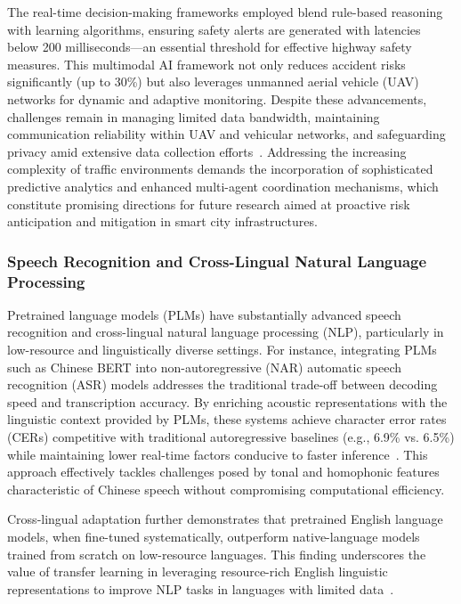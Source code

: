 \documentclass[sigconf]{acmart}
\begin{document}
The real-time decision-making frameworks employed blend rule-based reasoning with learning algorithms, ensuring safety alerts are generated with latencies below 200 milliseconds—an essential threshold for effective highway safety measures. This multimodal AI framework not only reduces accident risks significantly (up to 30\%) but also leverages unmanned aerial vehicle (UAV) networks for dynamic and adaptive monitoring. Despite these advancements, challenges remain in managing limited data bandwidth, maintaining communication reliability within UAV and vehicular networks, and safeguarding privacy amid extensive data collection efforts~\cite{ref27}. Addressing the increasing complexity of traffic environments demands the incorporation of sophisticated predictive analytics and enhanced multi-agent coordination mechanisms, which constitute promising directions for future research aimed at proactive risk anticipation and mitigation in smart city infrastructures.

\subsubsection{Speech Recognition and Cross-Lingual Natural Language Processing}

Pretrained language models (PLMs) have substantially advanced speech recognition and cross-lingual natural language processing (NLP), particularly in low-resource and linguistically diverse settings. For instance, integrating PLMs such as Chinese BERT into non-autoregressive (NAR) automatic speech recognition (ASR) models addresses the traditional trade-off between decoding speed and transcription accuracy. By enriching acoustic representations with the linguistic context provided by PLMs, these systems achieve character error rates (CERs) competitive with traditional autoregressive baselines (e.g., 6.9\% vs. 6.5\%) while maintaining lower real-time factors conducive to faster inference~\cite{ref32}. This approach effectively tackles challenges posed by tonal and homophonic features characteristic of Chinese speech without compromising computational efficiency.

Cross-lingual adaptation further demonstrates that pretrained English language models, when fine-tuned systematically, outperform native-language models trained from scratch on low-resource languages. This finding underscores the value of transfer learning in leveraging resource-rich English linguistic representations to improve NLP tasks in languages with limited data~\cite{ref31}. 
\end{document}
